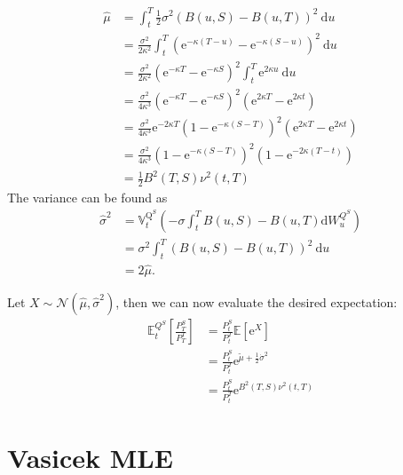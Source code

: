 \documentclass[12pt,twoside]{reedthesis}
\begin{document}
\[
\begin{aligned}
\hat{\mu} &=\int_{t}^{T} \frac{1}{2} \sigma^{2}(B(u, S)-B(u, T))^{2} \mathrm{~d} u \\
&=\frac{\sigma^{2}}{2 \kappa^{2}} \int_{t}^{T}\left(\mathrm{e}^{-\kappa(T-u)}-\mathrm{e}^{-\kappa(S-u)}\right)^{2} \mathrm{~d} u \\
&=\frac{\sigma^{2}}{2 \kappa^{2}}\left(\mathrm{e}^{-\kappa T}-\mathrm{e}^{-\kappa S}\right)^{2} \int_{t}^{T} \mathrm{e}^{2 \kappa u} \mathrm{~d} u \\
&=\frac{\sigma^{2}}{4 \kappa^{3}}\left(\mathrm{e}^{-\kappa T}-\mathrm{e}^{-\kappa S}\right)^{2}\left(\mathrm{e}^{2 \kappa T}-\mathrm{e}^{2 \kappa t}\right) \\
&=\frac{\sigma^{2}}{4 \kappa^{3}} \mathrm{e}^{-2 \kappa T}\left(1-\mathrm{e}^{-\kappa(S-T)}\right)^{2}\left(\mathrm{e}^{2 \kappa T}-\mathrm{e}^{2 \kappa t}\right) \\
&=\frac{\sigma^{2}}{4 \kappa^{3}}\left(1-\mathrm{e}^{-\kappa(S-T)}\right)^{2}\left(1-\mathrm{e}^{-2 \kappa(T-t)}\right) \\
&=\frac{1}{2} B^{2}(T, S) \nu^{2}(t, T)
\end{aligned}
\]
The variance can be found as
\[
\begin{aligned}
\hat{\sigma}^{2} &=\mathbb{V}_{t}^{\mathrm{Q}^{S}}\left(-\sigma \int_{t}^{T} B(u, S)-B(u, T) \mathrm{d} W_{u}^{Q^{S}}\right) \\
&=\sigma^{2} \int_{t}^{T}(B(u, S)-B(u, T))^{2} \mathrm{~d} u \\
&=2 \hat{\mu} .
\end{aligned}
\]

Let \(X \sim \mathcal{N}\left(\hat{\mu}, \hat{\sigma}^{2}\right)\), then we can now evaluate the desired expectation:
\[
\begin{aligned}
\mathbb{E}_{t}^{Q^{S}}\left[\frac{P_{T}^{S}}{P_{T}^{T}}\right] &=\frac{P_{t}^{S}}{P_{t}^{T}} \mathbb{E}\left[\mathrm{e}^{X}\right] \\
&=\frac{P_{t}^{S}}{P_{t}^{T}} \mathrm{e}^{\tilde{\mu}+\frac{1}{2} \dot{\sigma}^{2}} \\
&=\frac{P_{t}^{S}}{P_{t}^{T}} \mathrm{e}^{B^{2}(T, S) \nu^{2}(t, T)}
\end{aligned}
\]

\hypertarget{vasicek-mle}{%
\section{Vasicek MLE}\label{vasicek-mle}}
\end{document}
